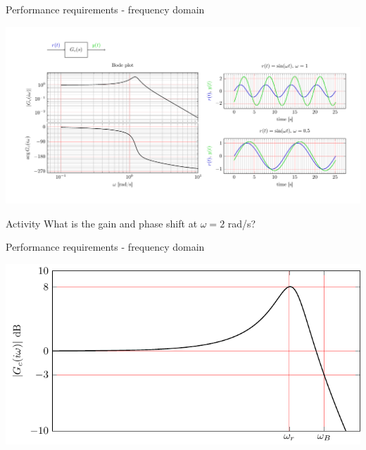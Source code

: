 \documentclass[presentation,aspectratio=169, usenames, dvipsnames]{beamer}
\begin{document}
\begin{frame}[label={sec:orgfd2f2c4}]{Performance requirements - frequency domain}
\begin{center}
  \includegraphics[width=1.0\linewidth]{../../figures/bode-closed-loop-example-responses}
\end{center}

\pause

\alert{Activity} What is the gain and phase shift at \(\omega = 2\) rad/s?
\end{frame}

\begin{frame}[label={sec:org8f6776f}]{Performance requirements - frequency domain}
\begin{center}
  \includegraphics[width=.8\linewidth]{../../figures/spec-bode-closed-loop-new}
\end{center}
\end{frame}
\end{document}
